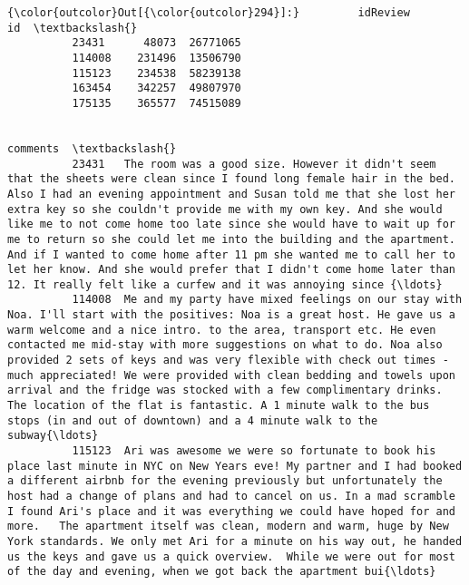 \documentclass[11pt]{article}
\begin{document}
\begin{Verbatim}[commandchars=\\\{\}]
{\color{outcolor}Out[{\color{outcolor}294}]:}         idReview        id  \textbackslash{}
          23431      48073  26771065   
          114008    231496  13506790   
          115123    234538  58239138   
          163454    342257  49807970   
          175135    365577  74515089   
          
                                                                                                                                                                                                                                                                                                                                                                                                                                                                                                                                                                                                                                 comments  \textbackslash{}
          23431   The room was a good size. However it didn't seem that the sheets were clean since I found long female hair in the bed. Also I had an evening appointment and Susan told me that she lost her extra key so she couldn't provide me with my own key. And she would like me to not come home too late since she would have to wait up for me to return so she could let me into the building and the apartment. And if I wanted to come home after 11 pm she wanted me to call her to let her know. And she would prefer that I didn't come home later than 12. It really felt like a curfew and it was annoying since {\ldots}   
          114008  Me and my party have mixed feelings on our stay with Noa. I'll start with the positives: Noa is a great host. He gave us a warm welcome and a nice intro. to the area, transport etc. He even contacted me mid-stay with more suggestions on what to do. Noa also provided 2 sets of keys and was very flexible with check out times - much appreciated! We were provided with clean bedding and towels upon arrival and the fridge was stocked with a few complimentary drinks. The location of the flat is fantastic. A 1 minute walk to the bus stops (in and out of downtown) and a 4 minute walk to the subway{\ldots}   
          115123  Ari was awesome we were so fortunate to book his place last minute in NYC on New Years eve! My partner and I had booked a different airbnb for the evening previously but unfortunately the host had a change of plans and had to cancel on us. In a mad scramble I found Ari's place and it was everything we could have hoped for and more.   The apartment itself was clean, modern and warm, huge by New York standards. We only met Ari for a minute on his way out, he handed us the keys and gave us a quick overview.  While we were out for most of the day and evening, when we got back the apartment bui{\ldots}   

\end{Verbatim}
\end{document}
